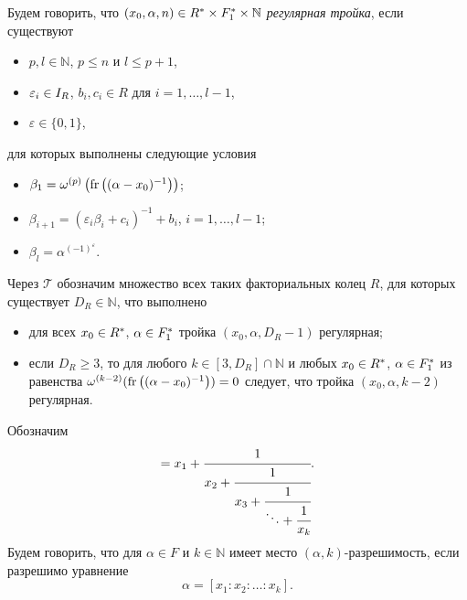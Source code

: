 \documentclass[_00_dissertation.tex]{subfiles}
\begin{document}
\begin{definition}
    Будем говорить, что $(x_0, \alpha, n) \in R^{*} \times F_1^{*} \times \mathbb{N}$ \emph{регулярная тройка}, если существуют
    \begin{itemize}
        \item $p, l \in \mathbb{N}$, $p \le n$ и $l \le p+1$,

        \item $\varepsilon_i \in I_{R}$, $b_i, c_i \in R$ для $i = 1, \dots, l-1$,

        \item $\varepsilon \in \{0, 1\}$,
    \end{itemize}
    для которых выполнены следующие условия
    \begin{itemize}
        \item $\beta_1 = \omega^{(p)}\left(\textrm{fr}\left((\alpha - x_0)^{-1}\right)\right)$;

        \item $\beta_{i+1} = (\varepsilon_i \beta_i + c_i)^{-1} + b_i$, $i = 1, \dots, l-1$;

        \item $\beta_{l} = \alpha^{(-1)^{\varepsilon}}$.
    \end{itemize}
\end{definition}

\begin{definition}
    Через $\mathcal{T}$ обозначим множество всех таких факториальных колец $R$, для которых существует $D_R \in \mathbb{N}$, что выполнено
    \begin{itemize}
        \item для всех $x_0 \in R^{*}$, $\alpha \in F_1^{*}$ тройка $(x_0, \alpha, D_R - 1)$ регулярная;

        \item если $D_R \ge 3$, то для любого $k \in [3, D_R] \cap \mathbb{N}$ и любых $x_0 \in R^{*}$, $\alpha \in F_1^{*}$ из равенства $\omega^{(k-2)}(\textrm{fr}\left((\alpha - x_0)^{-1}\right)) = 0$ следует, что тройка $(x_0, \alpha, k-2)$ регулярная.
    \end{itemize}
\end{definition}

\begin{definition}
    Обозначим
    \begin{equation*}
        [x_1: x_2: \dots: x_k] = x_{1} + \cfrac{1}{
            x_{2} + \cfrac{1}{
                x_{3} + \cfrac{1}{
                    \ddots + \cfrac{1}{
                        x_{k}
                    }
                }
            }
        }.
    \end{equation*}
    Будем говорить, что для $\alpha \in F$ и $k \in \mathbb{N}$ имеет место $(\alpha, k)$-разрешимость, если разрешимо уравнение
    \begin{equation*}
        \alpha = [x_1: x_2: \dots: x_k].
    \end{equation*}
\end{definition}
\end{document}
